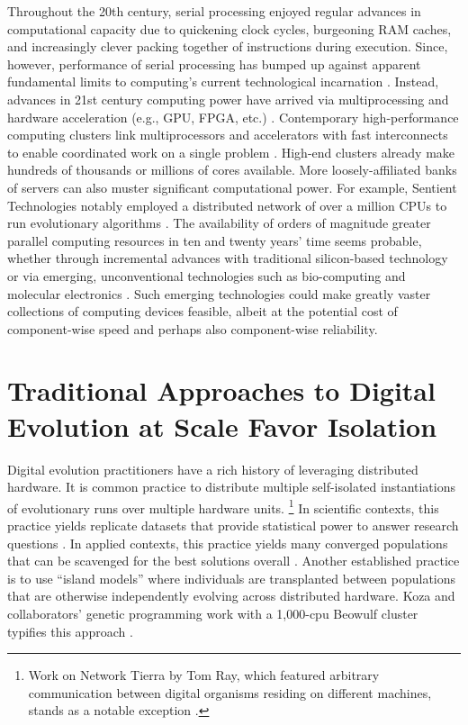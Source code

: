 Throughout the 20th century, serial processing enjoyed regular advances in computational capacity due to quickening clock cycles, burgeoning RAM caches, and increasingly clever packing together of instructions during execution.
Since, however, performance of serial processing has bumped up against apparent fundamental limits to computing’s current technological incarnation \citep{sutter2005free}.
Instead, advances in 21st century computing power have arrived via multiprocessing \citep[p.~55]{hennessy2011computer} and hardware acceleration (e.g., GPU, FPGA, etc.) \citep{che2008accelerating}.
Contemporary high-performance computing clusters link multiprocessors and accelerators with fast interconnects to enable coordinated work on a single problem \citep[p.~436]{hennessy2011computer}.
High-end clusters already make hundreds of thousands or millions of cores available. More loosely-affiliated banks of servers can also muster significant computational power.
For example, Sentient Technologies notably employed a distributed network of over a million CPUs to run evolutionary algorithms \citep{miikkulainen2019evolving}.
The availability of orders of magnitude greater parallel computing resources in ten and twenty years’ time seems probable, whether through incremental advances with traditional silicon-based technology or via emerging, unconventional technologies such as bio-computing \citep{benenson2009biocomputers} and molecular electronics \citep{xiang2016molecular}.
Such emerging technologies could make greatly vaster collections of computing devices feasible, albeit at the potential cost of component-wise speed \citep{bonnet2013amplifying, ellenbogen2000architectures} and perhaps also component-wise reliability.

\section{Traditional Approaches to Digital Evolution at Scale Favor Isolation}

Digital evolution practitioners have a rich history of leveraging distributed hardware.
It is common practice to distribute multiple self-isolated instantiations of evolutionary runs over multiple hardware units.
\footnote{
Work on Network Tierra by Tom Ray, which featured arbitrary communication between digital organisms residing on different machines, stands as a notable exception \citep{ray1995proposal}.
}
In scientific contexts, this practice yields replicate datasets that provide statistical power to answer research questions \citep{dolson2017spatial}.
In applied contexts, this practice yields many converged populations that can be scavenged for the best solutions overall \citep{hornby2006automated}.
Another established practice is to use ``island models'' where individuals are transplanted between populations that are otherwise independently evolving across distributed hardware.
Koza and collaborators’ genetic programming work with a 1,000-cpu Beowulf cluster typifies this approach \citep{bennett1999building}.

